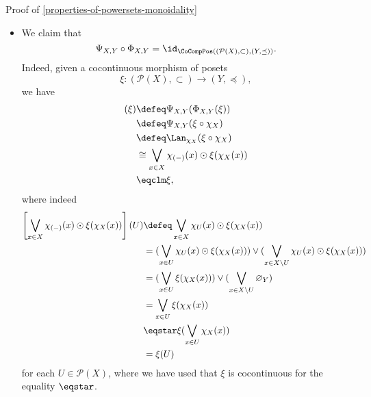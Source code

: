 \begin{Proof}{Proof of \cref{properties-of-powersets-monoidality}}
\begin{itemize}
            for each $f\in\Sets(X,Y)$.
        \item{}We claim that
            \[
                \Psi_{X,Y}\circ\Phi_{X,Y}%
                =%
                \id_{\CoCompPos((\mathcal{P}(X),\subset),(Y,\preceq))}.%
            \]%
            Indeed, given a cocontinuous morphism of posets
            \[
                \xi%
                \colon%
                (\mathcal{P}(X),\subset)%
                \to%
                (Y,\preceq),%
            \]%
            we have
            \begin{align*}
                [\Psi_{X,Y}\circ\Phi_{X,Y}](\xi) &\defeq \Psi_{X,Y}(\Phi_{X,Y}(\xi))\\%
                                                 &\defeq \Psi_{X,Y}(\xi\circ\chi_{X})\\%
                                                 &\defeq \Lan_{\chi_{X}}(\xi\circ\chi_{X})\\%
                                                 &\cong  \bigvee_{x\in X}\chi_{(-)}(x)\odot\xi(\chi_{X}(x))\\%
                                                 &\eqclm \xi,%
            \end{align*}
            where indeed
            \begingroup\footnotesize
            \begin{align*}
                \left[\bigvee_{x\in X}\chi_{(-)}(x)\odot\xi(\chi_{X}(x))\right](U) &\defeq  \bigvee_{x\in X}\chi_{U}(x)\odot\xi(\chi_{X}(x))\\%
                                                                                   &=       (\bigvee_{x\in U}\chi_{U}(x)\odot\xi(\chi_{X}(x)))\vee(\bigvee_{x\in X\setminus U}\chi_{U}(x)\odot\xi(\chi_{X}(x)))\\%
                                                                                   &=       (\bigvee_{x\in U}\xi(\chi_{X}(x)))\vee(\bigvee_{x\in X\setminus U}\varnothing_{Y})\\%
                                                                                   &=       \bigvee_{x\in U}\xi(\chi_{X}(x))\\%
                                                                                   &\eqstar \xi(\bigvee_{x\in U}\chi_{X}(x))\\%
                                                                                   &=       \xi(U)%
            \end{align*}
            \endgroup
            for each $U\in\mathcal{P}(X)$, where we have used that $\xi$ is cocontinuous for the equality $\eqstar$.

\end{itemize}
\end{Proof}
